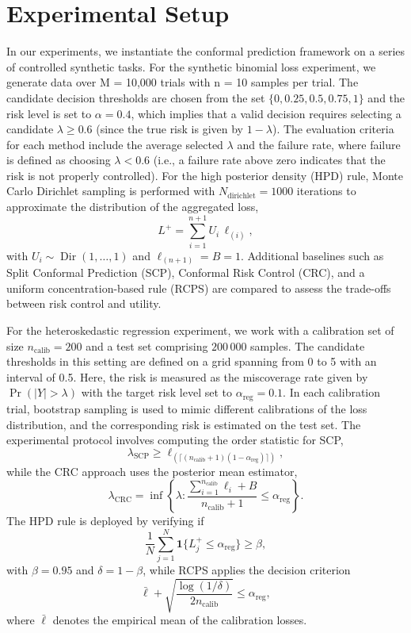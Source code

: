 \documentclass{article} %
\begin{document}
\section{Experimental Setup}
In our experiments, we instantiate the conformal prediction framework on a series of controlled synthetic tasks. For the synthetic binomial loss experiment, we generate data over M = 10,000 trials with n = 10 samples per trial. The candidate decision thresholds are chosen from the set \(\{0, 0.25, 0.5, 0.75, 1\}\) and the risk level is set to \(\alpha = 0.4\), which implies that a valid decision requires selecting a candidate \(\lambda \geq 0.6\) (since the true risk is given by \(1-\lambda\)). The evaluation criteria for each method include the average selected \(\lambda\) and the failure rate, where failure is defined as choosing \(\lambda < 0.6\) (i.e., a failure rate above zero indicates that the risk is not properly controlled). For the high posterior density (HPD) rule, Monte Carlo Dirichlet sampling is performed with \(N_{\text{dirichlet}} = 1000\) iterations to approximate the distribution of the aggregated loss,
\[
L^+ = \sum_{i=1}^{n+1} U_i \, \ell_{(i)},
\]
with \(U_i \sim \operatorname{Dir}(1,\ldots,1)\) and \(\ell_{(n+1)} = B = 1\). Additional baselines such as Split Conformal Prediction (SCP), Conformal Risk Control (CRC), and a uniform concentration-based rule (RCPS) are compared to assess the trade-offs between risk control and utility.

For the heteroskedastic regression experiment, we work with a calibration set of size \(n_{\text{calib}} = 200\) and a test set comprising \(200\,000\) samples. The candidate thresholds in this setting are defined on a grid spanning from 0 to 5 with an interval of 0.5. Here, the risk is measured as the miscoverage rate given by \(\Pr(|Y|>\lambda)\) with the target risk level set to \(\alpha_{\text{reg}} = 0.1\). In each calibration trial, bootstrap sampling is used to mimic different calibrations of the loss distribution, and the corresponding risk is estimated on the test set. The experimental protocol involves computing the order statistic for SCP,
\[
\lambda_{\text{SCP}} \geq \ell_{(\lceil (n_{\text{calib}}+1)(1-\alpha_{\text{reg}}) \rceil)},
\]
while the CRC approach uses the posterior mean estimator,
\[
\lambda_{\text{CRC}} = \inf\left\{\lambda : \frac{\sum_{i=1}^{n_{\text{calib}}} \ell_i + B}{n_{\text{calib}}+1} \le \alpha_{\text{reg}}\right\}.
\]
The HPD rule is deployed by verifying if
\[
\frac{1}{N}\sum_{j=1}^N \mathbf{1}\{L^+_j \le \alpha_{\text{reg}}\} \geq \beta,
\]
with \(\beta = 0.95\) and \(\delta = 1-\beta\), while RCPS applies the decision criterion
\[
\bar{\ell} + \sqrt{\frac{\log(1/\delta)}{2n_{\text{calib}}}} \leq \alpha_{\text{reg}},
\]
where \(\bar{\ell}\) denotes the empirical mean of the calibration losses.
\end{document}
